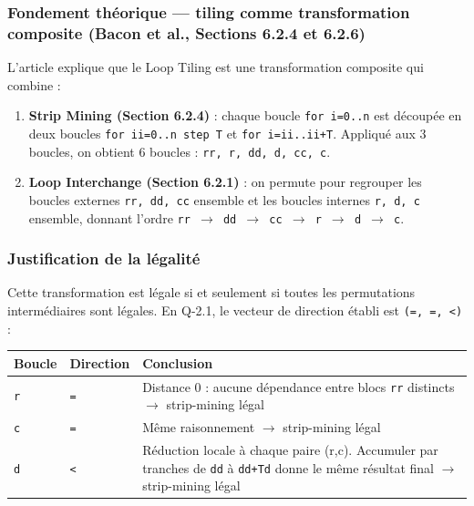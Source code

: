 \documentclass[a4paper,11pt]{article}
\newcommand{\code}[1]{\texttt{\color{CodeRed}#1}}
\begin{document}
\subsubsection{Fondement th\'eorique --- tiling comme transformation composite (Bacon et al., Sections 6.2.4 et 6.2.6)}

L'article explique que le Loop Tiling est une transformation composite qui combine :

\begin{enumerate}[leftmargin=1.5em]
  \item \textbf{Strip Mining (Section 6.2.4)} : chaque boucle \code{for i=0..n} est
        d\'ecoup\'ee en deux boucles \code{for ii=0..n step T} et
        \code{for i=ii..ii+T}. Appliqu\'e aux 3 boucles, on obtient 6 boucles :
        \code{rr, r, dd, d, cc, c}.
  \item \textbf{Loop Interchange (Section 6.2.1)} : on permute pour regrouper les
        boucles externes \code{rr, dd, cc} ensemble et les boucles internes
        \code{r, d, c} ensemble, donnant l'ordre \code{rr\,$\to$\,dd\,$\to$\,cc\,$\to$\,r\,$\to$\,d\,$\to$\,c}.
\end{enumerate}

\subsubsection{Justification de la l\'egalit\'e}

Cette transformation est l\'egale si et seulement si toutes les permutations
interm\'ediaires sont l\'egales. En Q-2.1, le vecteur de direction \'etabli est
\texttt{(=, =, <)} :

\begin{center}
\begin{tabular}{C{2cm}C{2cm}L{9cm}}
  \toprule
  \textbf{Boucle} & \textbf{Direction} & \textbf{Conclusion} \\
  \midrule
  \code{r} & \texttt{=} & Distance 0 : aucune d\'ependance entre blocs \code{rr} distincts $\to$ strip-mining l\'egal \\
  \code{c} & \texttt{=} & M\^eme raisonnement $\to$ strip-mining l\'egal \\
  \code{d} & \texttt{<} & R\'eduction locale \`a chaque paire (r,c). Accumuler par tranches de \code{dd} \`a \code{dd+Td} donne le m\^eme r\'esultat final $\to$ strip-mining l\'egal \\
  \bottomrule
\end{tabular}
\end{center}
\end{document}
